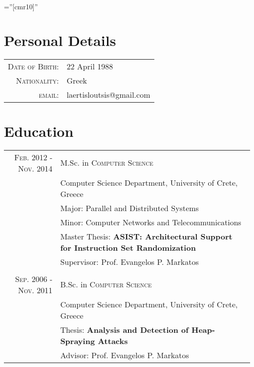 \documentclass[a4paper,10pt]{article} %
\begin{document}
\pagestyle{empty} %

\font\fb=''[cmr10]'' %


\par{\bigskip\par} %

\section{Personal Details}

\begin{tabular}{rl}
\textsc{Date of Birth:} & 22 April 1988 \\
\textsc{Nationality:} & Greek \\
\textsc{email:} & laertisloutsis@gmail.com
\end{tabular}


\section{Education}

\begin{tabular}{rl}	

\textsc{Feb. 2012 - Nov. 2014} & M.Sc. in \textsc{Computer Science} \\
& Computer Science Department, University of Crete, Greece \\
& Major: Parallel and Distributed Systems \\
& Minor: Computer Networks and Telecommunications \\
& Master Thesis: \textbf{ASIST: Architectural Support for Instruction Set Randomization} \\
& Supervisor: Prof. Evangelos P. Markatos \\
\\

\textsc{Sep. 2006 - Nov. 2011} & B.Sc. in \textsc{Computer Science} \\
& Computer Science Department, University of Crete, Greece \\
& Thesis: \textbf{Analysis and Detection of Heap-Spraying Attacks} \\
& Advisor: Prof. Evangelos P. Markatos \\

\end{tabular}
\end{document}
